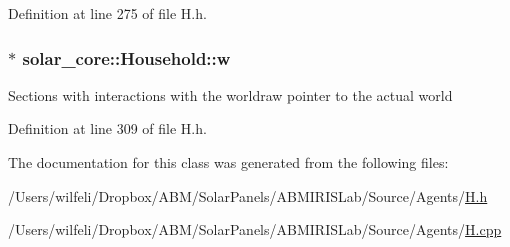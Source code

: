 Definition at line 275 of file H.\+h.

\hypertarget{classsolar__core_1_1_household_a01ac4643c725f397ba7485209a906e4d}{}
\subsubsection[{w}]{$\ast$ solar\+\_\+core\+::\+Household\+::w\hspace{0.3cm}{\ttfamily [protected]}}\label{classsolar__core_1_1_household_a01ac4643c725f397ba7485209a906e4d}
Sections with interactions with the worldraw pointer to the actual world 

Definition at line 309 of file H.\+h.



The documentation for this class was generated from the following files\+:\begin{DoxyCompactItemize}
\item 
/\+Users/wilfeli/\+Dropbox/\+A\+B\+M/\+Solar\+Panels/\+A\+B\+M\+I\+R\+I\+S\+Lab/\+Source/\+Agents/\hyperlink{_h_8h}{H.\+h}\item 
/\+Users/wilfeli/\+Dropbox/\+A\+B\+M/\+Solar\+Panels/\+A\+B\+M\+I\+R\+I\+S\+Lab/\+Source/\+Agents/\hyperlink{_h_8cpp}{H.\+cpp}\end{DoxyCompactItemize}
